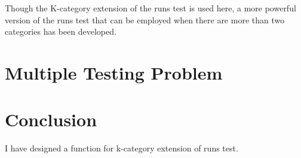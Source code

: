 \documentclass[12pt]{article}
\theoremstyle{plain}
\theoremstyle{definition}
\theoremstyle{remark}
\begin{document}
Though the K-category extension of the runs test is used here, a more powerful version\cite{3.4} of the runs test that can be employed when there are more than two categories has been developed. 





\newpage
\section{Multiple Testing Problem}



\newpage
\section{Conclusion}
I have designed a function for k-category extension of runs test.
\end{document}
